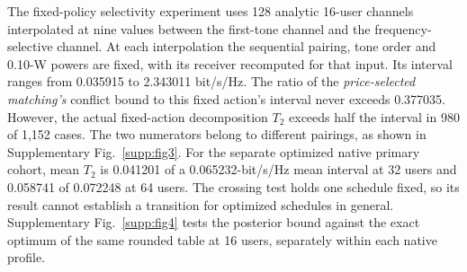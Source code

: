 \documentclass[10pt,letterpaper]{article}
\begin{document}
The fixed-policy selectivity experiment uses 128 analytic 16-user channels
interpolated at nine values between the first-tone channel and the
frequency-selective channel. At each interpolation the sequential pairing,
tone order and 0.10-W powers are fixed, with its receiver recomputed for
that input. Its interval ranges from 0.035915 to 2.343011 bit/s/Hz.
The ratio of the \emph{price-selected matching's} conflict bound to this
fixed action's interval never exceeds 0.377035.
However, the actual fixed-action decomposition \(T_2\) exceeds half the interval
in 980 of 1,152 cases. The two numerators belong to different pairings,
as shown in Supplementary Fig.~\ref{supp:fig3}.
For the separate optimized native primary cohort, mean \(T_2\) is
0.041201 of a 0.065232-bit/s/Hz mean interval at 32 users and
0.058741 of 0.072248 at 64 users. The crossing test holds one schedule fixed, so its result cannot establish a transition for optimized schedules in general. Supplementary Fig.~\ref{supp:fig4} tests the posterior bound against
the exact optimum of the same rounded table at 16 users, separately
within each native profile.
\end{document}
